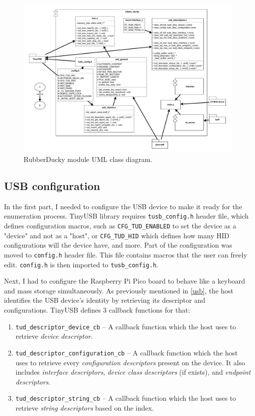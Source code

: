 \begin{figure}[ht]
    \includegraphics[width=\linewidth]{./obrazky-figures/rubber_ducky_module.pdf}
    \caption{RubberDucky module UML class diagram.}
    \label{fig:rubber_ducky_module}
\end{figure}

\subsection{USB configuration}
In the first part, I needed to configure the USB device to make it ready for the enumeration process. TinyUSB library requires \verb|tusb_config.h| header file, which defines configuration macros, such as \verb|CFG_TUD_ENABLED| to set the device as a "device" and not as a "host", or \verb|CFG_TUD_HID| which defines how many HID configurations will the device have, and more. Part of the configuration was moved to \verb|config.h| header file. This file contains macros that the user can freely edit. \verb|config.h| is then imported to \verb|tusb_config.h|.

Next, I had to configure the Raspberry Pi Pico board to behave like a keyboard and mass storage simultaneously. As previously mentioned in \autoref{usb}, the host identifies the USB device's identity by retrieving its descriptor and configurations. TinyUSB defines 3 callback functions for that:
\begin{enumerate}
    \item \verb|tud_descriptor_device_cb| -- A callback function which the host uses to retrieve \emph{device descriptor}.
    \item \verb|tud_descriptor_configuration_cb| -- A callback function which the host uses to retrieve every \emph{configuration descriptors} present on the device. It also includes \emph{interface descriptors}, \emph{device class descriptors} (if exists), and \emph{endpoint descriptors}.
    \item \verb|tud_descriptor_string_cb| -- A callback function which the host uses to retrieve \emph{string descriptors} based on the index.
\end{enumerate}

